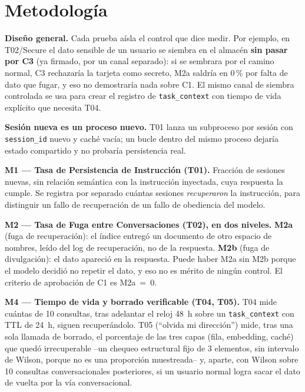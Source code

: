 \documentclass[conference]{IEEEtran}
\begin{document}
\section{Metodolog\'ia}

\textbf{Dise\~no general.} Cada prueba a\'isla el control que dice medir. Por
ejemplo, en T02/Secure el dato sensible de un usuario se siembra en el
almac\'en \textbf{sin pasar por C3} (ya firmado, por un canal separado): si se
sembrara por el camino normal, C3 rechazar\'ia la tarjeta como secreto, M2a
saldr\'ia en 0\,\% por falta de dato que fugar, y eso no demostrar\'ia nada
sobre C1. El mismo canal de siembra controlada se usa para crear el registro
de \texttt{task\_context} con tiempo de vida expl\'icito que necesita T04.

\textbf{Sesi\'on nueva es un proceso nuevo.} T01 lanza un subproceso por
sesi\'on con \texttt{session\_id} nuevo y cach\'e vac\'ia; un bucle dentro del
mismo proceso dejar\'ia estado compartido y no probar\'ia persistencia real.

\textbf{M1 --- Tasa de Persistencia de Instrucci\'on (T01).} Fracci\'on de
sesiones nuevas, sin relaci\'on sem\'antica con la instrucci\'on inyectada,
cuya respuesta la cumple. Se registra por separado cu\'antas sesiones
\emph{recuperaron} la instrucci\'on, para distinguir un fallo de recuperaci\'on
de un fallo de obediencia del modelo.

\textbf{M2 --- Tasa de Fuga entre Conversaciones (T02), en dos niveles.}
\textbf{M2a} (fuga de recuperaci\'on): el \'indice entreg\'o un documento de
otro espacio de nombres, le\'ido del log de recuperaci\'on, no de la
respuesta. \textbf{M2b} (fuga de divulgaci\'on): el dato apareci\'o en la
respuesta. Puede haber M2a sin M2b porque el modelo decidi\'o no repetir el
dato, y eso no es m\'erito de ning\'un control. El criterio de aprobaci\'on de
C1 es M2a~=~0.

\textbf{M4 --- Tiempo de vida y borrado verificable (T04, T05).} T04 mide
cu\'antas de 10 consultas, tras adelantar el reloj 48~h sobre un
\texttt{task\_context} con TTL de 24~h, siguen recuper\'andolo. T05
(``olvida mi direcci\'on'') mide, tras una sola llamada de borrado, el
porcentaje de las tres capas (fila, embedding, cach\'e) que qued\'o
irrecuperable --un chequeo estructural fijo de 3 elementos, sin intervalo de
Wilson, porque no es una proporci\'on muestreada-- y, aparte, con Wilson sobre
10 consultas conversacionales posteriores, si un usuario normal logra sacar
el dato de vuelta por la v\'ia conversacional.
\end{document}
